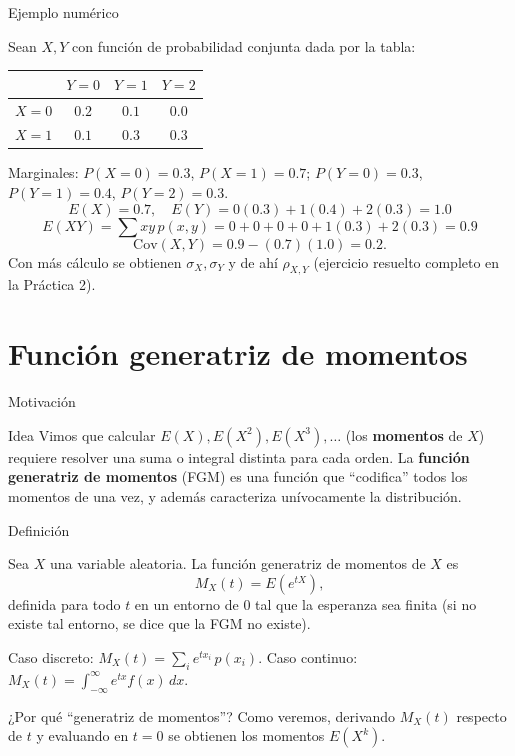 \documentclass[aspectratio=169,11pt]{beamer}
\begin{document}
\begin{frame}{Ejemplo numérico}
\begin{example}
Sean $X, Y$ con función de probabilidad conjunta dada por la tabla:
\begin{center}
\begin{tabular}{c|ccc}
 & $Y=0$ & $Y=1$ & $Y=2$ \\ \hline
$X=0$ & $0.2$ & $0.1$ & $0.0$ \\
$X=1$ & $0.1$ & $0.3$ & $0.3$
\end{tabular}
\end{center}
Marginales: $P(X=0)=0.3$, $P(X=1)=0.7$; $P(Y=0)=0.3$, $P(Y=1)=0.4$, $P(Y=2)=0.3$.
\[
E(X) = 0.7, \quad E(Y) = 0(0.3)+1(0.4)+2(0.3) = 1.0
\]
\[
E(XY) = \sum xy\, p(x,y) = 0 + 0 + 0 + 0 + 1(0.3) + 2(0.3) = 0.9
\]
\[
\text{Cov}(X,Y) = 0.9 - (0.7)(1.0) = 0.2.
\]
Con más cálculo se obtienen $\sigma_X, \sigma_Y$ y de ahí $\rho_{X,Y}$ (ejercicio resuelto completo en la Práctica 2).
\end{example}
\end{frame}

\section{Función generatriz de momentos}

\begin{frame}{Motivación}
\begin{block}{Idea}
Vimos que calcular $E(X), E(X^2), E(X^3), \dots$ (los \textbf{momentos} de $X$) requiere resolver una suma o integral distinta para cada orden. La \textbf{función generatriz de momentos} (FGM) es una función que ``codifica'' todos los momentos de una vez, y además caracteriza unívocamente la distribución.
\end{block}
\end{frame}

\begin{frame}{Definición}
\begin{definition}
Sea $X$ una variable aleatoria. La función generatriz de momentos de $X$ es
\[
M_X(t) = E\left(e^{tX}\right),
\]
definida para todo $t$ en un entorno de $0$ tal que la esperanza sea finita (si no existe tal entorno, se dice que la FGM no existe).
\end{definition}

Caso discreto: $M_X(t) = \sum_i e^{t x_i}\, p(x_i)$. Caso continuo: $M_X(t) = \int_{-\infty}^\infty e^{tx} f(x)\, dx$.

\begin{block}{¿Por qué ``generatriz de momentos''?}
Como veremos, derivando $M_X(t)$ respecto de $t$ y evaluando en $t=0$ se obtienen los momentos $E(X^k)$.
\end{block}
\end{frame}
\end{document}
